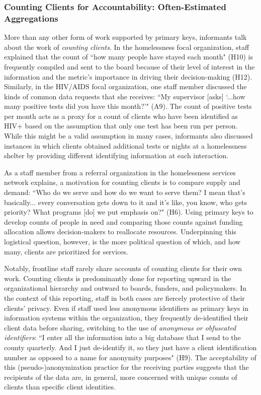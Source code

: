 \subsubsection{Counting Clients for Accountability: Often-Estimated Aggregations}
More than any other form of work supported by primary keys, informants talk about the work of \textit{counting clients}. In the homelessness focal organization, staff explained that the count of ``how many people have stayed each month" (H10) is frequently compiled and sent to the board because of their level of interest in the information and the metric's importance in driving their decision-making (H12). Similarly, in the HIV/AIDS focal organization, one staff member discussed the kinds of common data requests that she receives: ``My supervisor [asks] `...how many positive tests did you have this month?'" (A9). The count of positive tests per month acts as a proxy for a count of clients who have been identified as HIV+ based on the assumption that only one test has been run per person. While this might be a valid assumption in many cases, informants also discussed instances in which clients obtained additional tests or nights at a homelessness shelter by providing different identifying information at each interaction.

As a staff member from a referral organization in the homelessness services network explains, a motivation for counting clients is to compare supply and demand: ``Who do we serve and how do we want to serve them? I mean that's basically... every conversation gets down to it and it's like, you know, who gets priority? What programs [do] we put emphasis on?" (H6). Using primary keys to develop counts of people in need and comparing those counts against funding allocation allows decision-makers to reallocate resources. Underpinning this logistical question, however, is the more political question of which, and how many, clients are prioritized for services.

Notably, frontline staff rarely share accounts of counting clients for their own work. Counting clients is predominantly done for reporting upward in the organizational hierarchy and outward to boards, funders, and policymakers. In the context of this reporting, staff in both cases are fiercely protective of their clients' privacy. Even if staff used less anonymous identifiers as primary keys in information systems within the organization, they frequently de-identified their client data before sharing, switching to the use of \textit{anonymous or obfuscated identifiers}: ``I enter all the information into a big database that I send to the county quarterly. And I just de-identify it, so they just have a client identification number as opposed to a name for anonymity purposes" (H9). The acceptability of this (pseudo-)anonymization practice for the receiving parties suggests that the recipients of the data are, in general, more concerned with unique counts of clients than specific client identities. 

